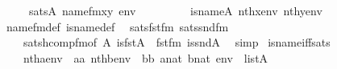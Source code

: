\begin{isabellebody}
\ \ \ \ {\isasymLongrightarrow}\ sats{\isacharparenleft}{\kern0pt}A{\isacharcomma}{\kern0pt}\ name{}{\isacharunderscore}{\kern0pt}fm{\isacharparenleft}{\kern0pt}x{\isacharcomma}{\kern0pt}y{\isacharparenright}{\kern0pt}{\isacharcomma}{\kern0pt}\ env{\isacharparenright}{\kern0pt}\ {\isasymlongleftrightarrow}\isanewline
\ \ \ \ \ \ \ \ is{\isacharunderscore}{\kern0pt}name{}{\isacharparenleft}{\kern0pt}{\isacharhash}{\kern0pt}{\isacharhash}{\kern0pt}A{\isacharcomma}{\kern0pt}\ nth{\isacharparenleft}{\kern0pt}x{\isacharcomma}{\kern0pt}env{\isacharparenright}{\kern0pt}{\isacharcomma}{\kern0pt}\ nth{\isacharparenleft}{\kern0pt}y{\isacharcomma}{\kern0pt}env{\isacharparenright}{\kern0pt}{\isacharparenright}{\kern0pt}{\isachardoublequoteclose}\isanewline
%
\isadelimproof
\ \ %
\endisadelimproof
%
\isatagproof
{}\isamarkupfalse%
\ name{}{\isacharunderscore}{\kern0pt}fm{\isacharunderscore}{\kern0pt}def\ is{\isacharunderscore}{\kern0pt}name{}{\isacharunderscore}{\kern0pt}def\ \isamarkupfalse%
\ sats{\isacharunderscore}{\kern0pt}fst{\isacharunderscore}{\kern0pt}fm\ sats{\isacharunderscore}{\kern0pt}snd{\isacharunderscore}{\kern0pt}fm\ \isanewline
\ \ \ \ sats{\isacharunderscore}{\kern0pt}hcomp{\isacharunderscore}{\kern0pt}fm{\isacharbrackleft}{\kern0pt}of\ A\ {\isachardoublequoteopen}is{\isacharunderscore}{\kern0pt}fst{\isacharparenleft}{\kern0pt}{\isacharhash}{\kern0pt}{\isacharhash}{\kern0pt}A{\isacharparenright}{\kern0pt}{\isachardoublequoteclose}\ {\isacharunderscore}{\kern0pt}\ fst{\isacharunderscore}{\kern0pt}fm\ {\isachardoublequoteopen}is{\isacharunderscore}{\kern0pt}snd{\isacharparenleft}{\kern0pt}{\isacharhash}{\kern0pt}{\isacharhash}{\kern0pt}A{\isacharparenright}{\kern0pt}{\isachardoublequoteclose}{\isacharbrackright}{\kern0pt}\ \isamarkupfalse%
\ simp%
\endisatagproof
{\isafoldproof}%
%
\isadelimproof
\isanewline
%
\endisadelimproof
\isanewline
{}\isamarkupfalse%
\ is{\isacharunderscore}{\kern0pt}name{}{\isacharunderscore}{\kern0pt}iff{\isacharunderscore}{\kern0pt}sats{\isacharcolon}{\kern0pt}\isanewline
\ \ \isanewline
\ \ \ \ {\isachardoublequoteopen}nth{\isacharparenleft}{\kern0pt}a{\isacharcomma}{\kern0pt}env{\isacharparenright}{\kern0pt}\ {\isacharequal}{\kern0pt}\ aa{\isachardoublequoteclose}\ {\isachardoublequoteopen}nth{\isacharparenleft}{\kern0pt}b{\isacharcomma}{\kern0pt}env{\isacharparenright}{\kern0pt}\ {\isacharequal}{\kern0pt}\ bb{\isachardoublequoteclose}\ {\isachardoublequoteopen}a{\isasymin}nat{\isachardoublequoteclose}\ {\isachardoublequoteopen}b{\isasymin}nat{\isachardoublequoteclose}\ {\isachardoublequoteopen}env\ {\isasymin}\ list{\isacharparenleft}{\kern0pt}A{\isacharparenright}{\kern0pt}{\isachardoublequoteclose}\isanewline

\end{isabellebody}
